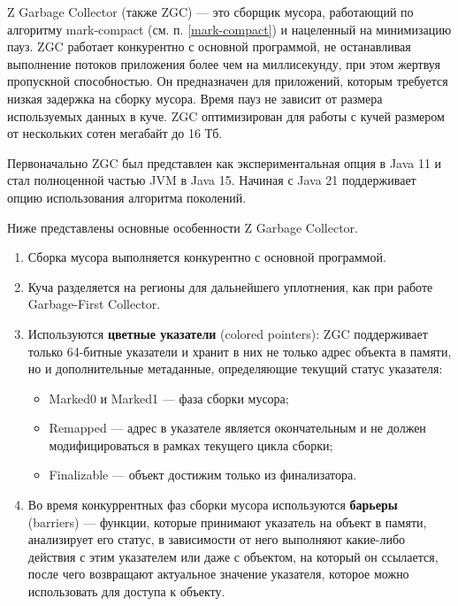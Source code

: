 Z Garbage Collector (также ZGC) --- это сборщик мусора, работающий по алгоритму mark-compact (см. п. \ref{mark-compact}) и нацеленный на минимизацию пауз. ZGC работает конкурентно с основной программой, не останавливая выполнение потоков приложения более чем на миллисекунду, при этом жертвуя пропускной способностью. Он предназначен для приложений, которым требуется низкая задержка на сборку мусора. Время пауз не зависит от размера используемых данных в куче. ZGC оптимизирован для работы с кучей размером от нескольких сотен мегабайт до 16 Тб. \cite{java_zgc}

Первоначально ZGC был представлен как экспериментальная опция в Java 11 и стал полноценной частью JVM в Java 15. \cite{java_zgc} Начиная с Java 21 поддерживает опцию использования алгоритма поколений. \cite{java_21_available_collectors}

Ниже представлены основные особенности Z Garbage Collector. \cite{java_zgc}

\begin{enumerate}[label*=\arabic*.]
	\item Сборка мусора выполняется конкурентно с основной программой.
	
	\item Куча разделяется на регионы для дальнейшего уплотнения, как при работе Garbage-First Collector.
	
	\item Используются \textbf{цветные указатели} (colored pointers): ZGC поддерживает только 64-битные указатели и хранит в них не только адрес объекта в памяти, но и дополнительные метаданные, определяющие текущий статус указателя:
	\begin{itemize}[label*=---]
		\item Marked0 и Marked1 --- фаза сборки мусора;
		\item Remapped --- адрес в указателе является окончательным и не должен модифицироваться в рамках текущего цикла сборки;
		\item Finalizable --- объект достижим только из финализатора.
	\end{itemize}

	\item Во время конкуррентных фаз сборки мусора используются \textbf{барьеры} (barriers) --- функции, которые принимают указатель на объект в памяти, анализирует его статус, в зависимости от него выполняют какие-либо действия с этим указателем или даже с объектом, на который он ссылается, после чего возвращают актуальное значение указателя, которое можно использовать для доступа к объекту.
\end{enumerate}

